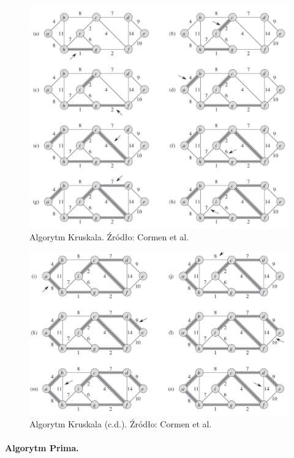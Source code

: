 \documentclass[10pt, oneside]{article}
\theoremstyle{remark}
\begin{document}
\begin{figure}[htpb]
	\centering
	\includegraphics[width=.9\textwidth]{figures/kruskal1}
	\caption{Algorytm Kruskala. Źródło: Cormen et al.}
\end{figure}
\begin{figure}[htpb]
	\centering
	\includegraphics[width=.9\textwidth]{figures/kruskal2}
	\caption{Algorytm Kruskala (c.d.). Źródło: Cormen et al.}
\end{figure}

\paragraph{Algorytm Prima.}
\end{document}
